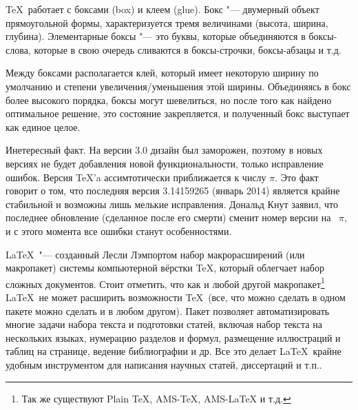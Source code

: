 \documentclass{article}
\begin{document}
			\TeX ~работает с боксами (box) и клеем (glue). Бокс "--- двумерный объект прямоугольной формы, характеризуется тремя 
		величинами (высота, ширина, глубина). Элементарные боксы "--- это буквы, которые объединяются в боксы-слова, которые в 				свою очередь сливаются в боксы-строчки, боксы-абзацы и т.д.

        	Между боксами располагается клей, который имеет некоторую ширину по умолчанию и степени увеличения/уменьшения этой 				ширины. Объединяясь в бокс более высокого порядка, боксы могут шевелиться, но после того как найдено оптимальное решение, 		это состояние закрепляется, и полученный бокс выступает как единое целое.
        
       		Инетересный факт. На версии 3.0 дизайн был заморожен, поэтому в новых версиях не будет добавления новой 						функциональности, только исправление ошибок. Версия \TeX 'a ассимтотически приближается к числу $\pi$. Это факт говорит о 		том, что последняя версия	3.14159265 (январь 2014) является крайне стабильной и возможны лишь мелькие исправления. 				Дональд Кнут заявил, что последнее обновление (сделанное после его смерти) сменит номер версии на ~$\pi$, и с этого 				момента все ошибки станут особенностями.
        		
			\LaTeX ~"--- созданный Лесли Лэмпортом набор макрорасширений (или макропакет) системы компьютерной вёрстки \TeX, 				который облегчает набор сложных документов. Стоит отметить, что как и любой другой макропакет\footnote{ Так же существуют 		Plain TeX, AMS-TeX, AMS-LaTeX и т.д.} \LaTeX ~не может расширить возможности \TeX ~(все, что можно сделать в одном пакете 		можно сделать и в любом другом). Пакет позволяет автоматизировать многие задачи набора текста и подготовки статей, 					включая набор текста на нескольких языках, нумерацию разделов и формул, размещение иллюстраций и таблиц на странице, 				ведение библиографии и др. Все это делает \LaTeX ~крайне удобным инструментом для написания научных статей, диссертаций и 		т.п..
		\newpage
			
\end{document}
